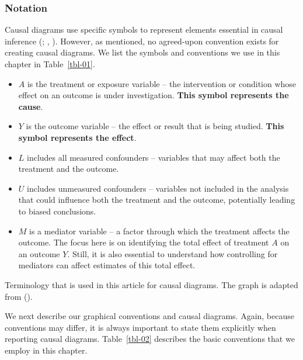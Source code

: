 \documentclass[
  singlecolumn]{article}
\providecommand{\tightlist}{%
  \setlength{\itemsep}{0pt}\setlength{\parskip}{0pt}}\usepackage{longtable,booktabs,array}
\begin{document}
\subsubsection{Notation}\label{notation}

Causal diagrams use specific symbols to represent elements essential in
causal inference (; ,
). However, as mentioned, no agreed-upon
convention exists for creating causal diagrams. We list the symbols and
conventions we use in this chapter in Table~\ref{tbl-01}.

\begin{itemize}
\tightlist
\item
  \textbf{\(A\)} is the treatment or exposure variable -- the
  intervention or condition whose effect on an outcome is under
  investigation. \textbf{This symbol represents the cause}.
\item
  \textbf{\(Y\)} is the outcome variable -- the effect or result that is
  being studied. \textbf{This symbol represents the effect}.
\item
  \textbf{\(L\)} includes all measured confounders -- variables that may
  affect both the treatment and the outcome.
\item
  \textbf{\(U\)} includes unmeasured confounders -- variables not
  included in the analysis that could influence both the treatment and
  the outcome, potentially leading to biased conclusions.
\item
  \textbf{\(M\)} is a mediator variable -- a factor through which the
  treatment affects the outcome. The focus here is on identifying the
  total effect of treatment \(A\) on an outcome \(Y\). Still, it is also
  essential to understand how controlling for mediators can affect
  estimates of this total effect.
\end{itemize}

\begin{table}

\caption{\label{tbl-01}Terminology that is used in this article for
causal diagrams. The graph is adapted from
().}

\centering{

\terminologylocalconventionssimple

}

\end{table}%

We next describe our graphical conventions and causal diagrams. Again,
because conventions may differ, it is always important to state them
explicitly when reporting causal diagrams. Table~\ref{tbl-02} describes
the basic conventions that we employ in this chapter.
\end{document}
